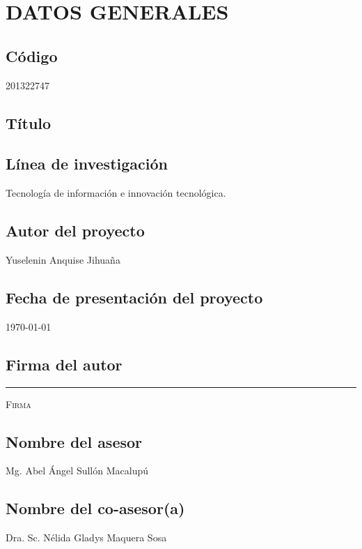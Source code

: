 \chapter{DATOS GENERALES}
\section{Código}
201322747
\section{Título}
\thesistitle
\section{Línea de investigación}
Tecnología de información e innovación tecnológica.
\section{Autor del proyecto}
Yuselenin Anquise Jihuaña
\section{Fecha de presentación del proyecto}
\today
\section{Firma del autor}
{
\vspace{8em}
\centering
\rule[0em]{20em}{0.5pt}%
\begin{center}
    \textsc{Firma}
\end{center}
}

\section{Nombre del asesor}
Mg. Abel Ángel Sullón Macalupú
\section{Nombre del co-asesor(a)}
Dra. Sc. Nélida Gladys Maquera Sosa
